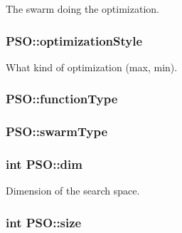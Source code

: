 The swarm doing the optimization. 

\hypertarget{classPSO_27295f34a6ad7f97533907344edebb97}{
\subsubsection{ {\bf PSO::optimizationStyle}}}
\label{classPSO_27295f34a6ad7f97533907344edebb97}


What kind of optimization (max, min). 

\hypertarget{classPSO_7ff7e28f5428af6383f97d41a14ab91c}{
\subsubsection{ {\bf PSO::functionType}}}
\label{classPSO_7ff7e28f5428af6383f97d41a14ab91c}


\hypertarget{classPSO_ab45164d2c0f86041d014fa51ebb78b5}{
\subsubsection{ {\bf PSO::swarmType}}}
\label{classPSO_ab45164d2c0f86041d014fa51ebb78b5}


\hypertarget{classPSO_4f1ce768b59640f64ed2b270764b32b1}{
\subsubsection{\setlength{\rightskip}{0pt plus 5cm}int {\bf PSO::dim}}}
\label{classPSO_4f1ce768b59640f64ed2b270764b32b1}


Dimension of the search space. 

\hypertarget{classPSO_4b11170c3bceecfa6baa5e09b53ead3e}{
\subsubsection{\setlength{\rightskip}{0pt plus 5cm}int {\bf PSO::size}}}
\label{classPSO_4b11170c3bceecfa6baa5e09b53ead3e}


